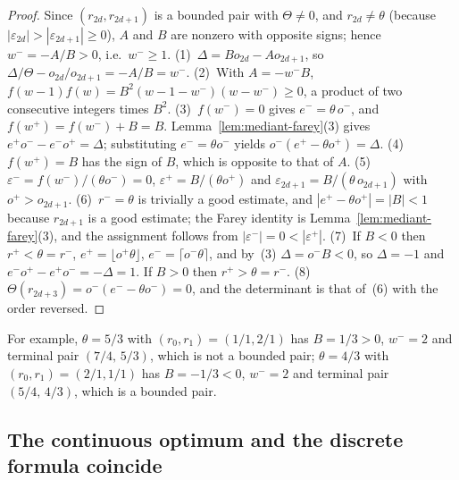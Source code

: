 \documentclass[12pt]{article}
\theoremstyle{definition}
\theoremstyle{remark}
\theoremstyle{plain}
\newcommand{\eps}{\varepsilon}
\newcommand{\Kval}{\Theta}
\newcommand{\Dval}{\Delta}
\newcommand{\wplus}{w^{+}}
\newcommand{\wminus}{w^{-}}
\newcommand{\rplus}{r^{+}}
\newcommand{\rminus}{r^{-}}
\newcommand{\eplus}{e^{+}}
\newcommand{\eminus}{e^{-}}
\newcommand{\odenp}{o^{+}}
\newcommand{\odenm}{o^{-}}
\newcommand{\epsplus}{\eps^{+}}
\newcommand{\epsminus}{\eps^{-}}
\begin{document}
\begin{proof}
Since $(r_{2d}, r_{2d+1})$ is a bounded pair with $\Kval \neq 0$, and
$r_{2d} \neq \theta$ (because $|\eps_{2d}| > |\eps_{2d+1}| \geq 0$), $A$ and $B$
are nonzero with opposite signs; hence $\wminus = -A/B > 0$, i.e.\ $\wminus \geq 1$.
(1)~$\Dval = Bo_{2d} - Ao_{2d+1}$, so
$\Dval/\Kval - o_{2d}/o_{2d+1} = -A/B = \wminus$.
(2)~With $A = -\wminus B$, $f(w-1)f(w) = B^2(w-1-\wminus)(w-\wminus) \geq 0$, a
product of two consecutive integers times $B^2$.
(3)~$f(\wminus) = 0$ gives $\eminus = \theta\,\odenm$, and $f(\wplus) = f(\wminus) + B = B$.
Lemma~\ref{lem:mediant-farey}(3) gives $\eplus\odenm - \eminus\odenp = \Dval$;
substituting $\eminus = \theta\odenm$ yields $\odenm(\eplus - \theta\odenp) = \Dval$.
(4)~$f(\wplus) = B$ has the sign of $B$, which is opposite to that of $A$.
(5)~$\epsminus = f(\wminus)/(\theta\odenm) = 0$, $\epsplus = B/(\theta\odenp)$ and
$\eps_{2d+1} = B/(\theta\,o_{2d+1})$ with $\odenp > o_{2d+1}$.
(6)~$\rminus = \theta$ is trivially a good estimate, and $|\eplus - \theta\odenp| = |B| < 1$
because $r_{2d+1}$ is a good estimate; the Farey identity is Lemma~\ref{lem:mediant-farey}(3),
and the assignment follows from $|\epsminus| = 0 < |\epsplus|$.
(7)~If $B < 0$ then $\rplus < \theta = \rminus$, $\eplus = \lfloor\odenp\theta\rfloor$,
$\eminus = \lceil\odenm\theta\rceil$, and by~(3) $\Dval = \odenm B < 0$, so $\Dval = -1$
and $\eminus\odenp - \eplus\odenm = -\Dval = 1$.
If $B > 0$ then $\rplus > \theta = \rminus$.
(8)~$\Kval(r_{2d+3}) = \odenm(\eminus - \theta\odenm) = 0$, and the determinant is
that of~(6) with the order reversed.
\end{proof}

\noindent
For example, $\theta = 5/3$ with $(r_0, r_1) = (1/1, 2/1)$ has $B = 1/3 > 0$,
$\wminus = 2$ and terminal pair $(7/4,\, 5/3)$, which is not a bounded pair;
$\theta = 4/3$ with $(r_0, r_1) = (2/1, 1/1)$ has $B = -1/3 < 0$, $\wminus = 2$
and terminal pair $(5/4,\, 4/3)$, which is a bounded pair.

\subsection*{The continuous optimum and the discrete formula coincide}
\end{document}
